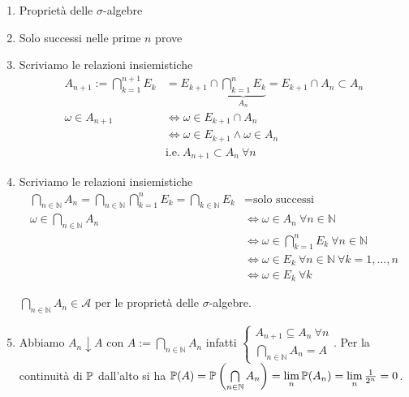 \begin{enumerate}
\item Proprietà delle $\sigma $-algebre
\item Solo successi nelle prime $n$ prove
\item Scriviamo le relazioni insiemistiche\begin{align*}
A_{n+1} :=\bigcap\limits _{k=1}^{n+1} E_{k} & =E_{k+1} \cap \underbrace{\bigcap\limits _{k=1}^{n} E_{k}}_{A_{n}} =E_{k+1} \cap A_{n} \subset A_{n}\\
\omega \in A_{n+1} & \iff \omega \in E_{k+1} \cap A_{n}\\
 & \iff \omega \in E_{k+1} \land \omega \in A_{n}\\
 & \text{i.e.} \ A_{n+1} \subset A_{n} \ \forall n
\end{align*}
\item Scriviamo le relazioni insiemistiche\begin{align*}
\bigcap\limits _{n\in \mathbb{N}} A_{n} =\bigcap\limits _{n\in \mathbb{N}}\bigcap\limits _{k=1}^{n} E_{k} =\bigcap\limits _{k\in \mathbb{N}} E_{k} & =\text{solo successi}\\
\omega \in \bigcap\limits _{n\in \mathbb{N}} A_{n} & \iff \omega \in A_{n} \ \forall n\in \mathbb{N}\\
 & \iff \omega \in \bigcap\limits _{k=1}^{n} E_{k} \ \forall n\in \mathbb{N}\\
 & \iff \omega \in E_{k} \ \forall n\in \mathbb{N} \ \forall k=1,\dots ,n\\
 & \iff \omega \in E_{k} \ \forall k
\end{align*}

$\bigcap\limits _{n\in \mathbb{N}} A_{n} \in \mathcal{A}$ per le proprietà delle $\sigma $-algebre.
\item Abbiamo $A_{n} \downarrow A$ con $A:=\bigcap\limits _{n\in \mathbb{N}} A_{n}$ infatti $\begin{cases}
A_{n+1} \subseteq A_{n} \ \forall n\\
\bigcap_{n\in \mathbb{N}} A_{n} =A
\end{cases}$. Per la continuità di $\mathbb{P}$ dall'alto si ha $\mathbb{P}( A) =\mathbb{P}\left(\bigcap\limits _{n\in \mathbb{N}} A_{n}\right) =\lim\limits _{n}\mathbb{P}( A_{n}) =\lim\limits _{n}\frac{1}{2^{n}} =0$.
\end{enumerate}
\Soluzione
